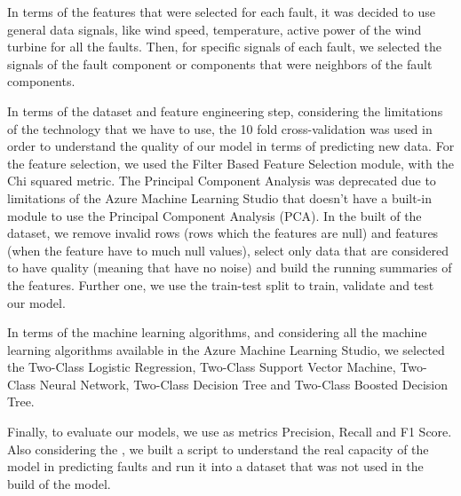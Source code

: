 
In terms of the features that were selected for each fault, it was decided to use general data signals, like wind speed, temperature, active power of the wind turbine for all the faults. Then, for specific signals of each fault, we selected the signals of the fault component or components that were neighbors of the fault components.

In terms of the dataset and feature engineering step, considering the limitations of the technology that we have to use, the 10 fold cross-validation was used in order to understand the quality of our model in terms of predicting new data. For the feature selection, we used the Filter Based Feature Selection module, with the Chi squared metric. The Principal Component Analysis was deprecated due to limitations of the Azure Machine Learning Studio that doesn't have a built-in module to use the Principal Component Analysis (PCA). In the built of the dataset, we remove invalid rows (rows which the features are null) and features (when the feature have to much null values), select only data that are considered to have quality (meaning that have no noise) and build the running summaries of the features. Further one, we use the train-test split to train, validate and test our model.

In terms of the machine learning algorithms, and considering all the machine learning algorithms available in the Azure Machine Learning Studio, we selected the Two-Class Logistic Regression, Two-Class Support Vector Machine, Two-Class Neural Network, Two-Class Decision Tree and Two-Class Boosted Decision Tree.

Finally, to evaluate our models, we use as metrics Precision, Recall and F1 Score. Also considering the \cite{MED_1}, we built a script to understand the real capacity of the model in predicting faults and run it into a dataset that was not used in the build of the model.